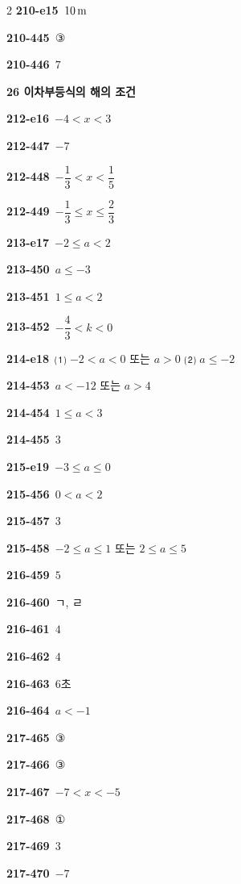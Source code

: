 \documentclass[10pt,a4paper]{article}
\begin{document}
\begin{multicols}{2}
\noindent\textbf{210-e15}\ $10\mkern3mu \mathrm{m}$\par
\noindent\textbf{210-445}\ ③\par
\noindent\textbf{210-446}\ $7$\par
\noindent\textbf{26 이차부등식의 해의 조건}\par\smallskip
\noindent\textbf{212-e16}\ $-4<x<3$\par
\noindent\textbf{212-447}\ $-7$\par
\noindent\textbf{212-448}\ $-\dfrac{1}{3}<x<\dfrac{1}{5}$\par
\noindent\textbf{212-449}\ $-\dfrac{1}{3}\le x\le \dfrac{2}{3}$\par
\noindent\textbf{213-e17}\ $-2\le a<2$\par
\noindent\textbf{213-450}\ $a\le -3$\par
\noindent\textbf{213-451}\ $1\le a<2$\par
\noindent\textbf{213-452}\ $-\dfrac{4}{3}<k<0$\par
\noindent\textbf{214-e18}\ ⑴ $-2<a<0$ 또는 $a>0$ ⑵ $a\le -2$\par
\noindent\textbf{214-453}\ $a<-12$ 또는 $a>4$\par
\noindent\textbf{214-454}\ $1\le a<3$\par
\noindent\textbf{214-455}\ $3$\par
\noindent\textbf{215-e19}\ $-3\le a\le 0$\par
\noindent\textbf{215-456}\ $0<a<2$\par
\noindent\textbf{215-457}\ $3$\par
\noindent\textbf{215-458}\ $-2\le a\le 1$ 또는 $2\le a\le 5$\par
\noindent\textbf{216-459}\ $5$\par
\noindent\textbf{216-460}\ ㄱ, ㄹ\par
\noindent\textbf{216-461}\ $4$\par
\noindent\textbf{216-462}\ $4$\par
\noindent\textbf{216-463}\ $6$초\par
\noindent\textbf{216-464}\ $a<-1$\par
\noindent\textbf{217-465}\ ③\par
\noindent\textbf{217-466}\ ③\par
\noindent\textbf{217-467}\ $-7<x<-5$\par
\noindent\textbf{217-468}\ ①\par
\noindent\textbf{217-469}\ $3$\par
\noindent\textbf{217-470}\ $-7$\par

\end{multicols}
\end{document}
